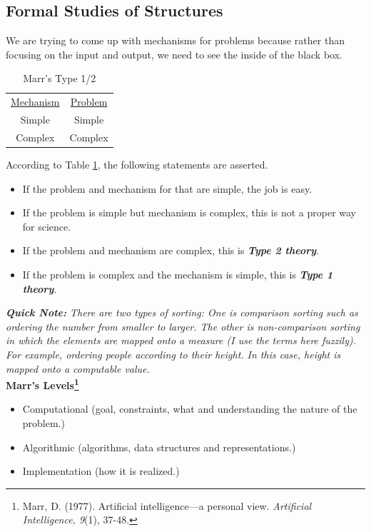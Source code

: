 \documentclass[12pt,a4paper]{article}
\begin{document}
\subsection{Formal Studies of Structures}
We are trying to come up with mechanisms for problems because rather than focusing on the input and output, we need to see the inside of the black box.\\
\begin{table}[H]
\centering
\begin{tabular}{c c}

\hline 
\underline{Mechanism} & \underline{Problem} \\ 
 
Simple & Simple \\ 

Complex & Complex \\ 
\hline
\end{tabular}
\caption{Marr's Type 1/2}
\label{tab:mech}
\end{table}

According to Table \ref{tab:mech}, the following statements are asserted. 
\begin{itemize}
\item If the problem and mechanism for that are simple, the job is easy.
\item If the problem is simple but mechanism is complex, this is not a proper way for science.
\item If the problem and mechanism are complex, this is \textbf{\emph{Type 2 theory}}.
\item If the problem is complex and the mechanism is simple, this is \emph{\textbf{Type 1 theory}}.
\end{itemize}

\indent \textit{\textbf{Quick Note:} There are two types of sorting: One is comparison sorting such as ordering the number from smaller to larger. The other is non-comparison sorting in which the elements are mapped onto a measure (I use the terms here fuzzily). For example, ordering people according to their height. In this case, height is mapped onto a computable value.}\\

\textbf{Marr's Levels\footnote{Marr, D. (1977). Artificial intelligence—a personal view. \textit{Artificial Intelligence, 9}(1), 37-48.}}
\begin{itemize}
\item Computational (goal, constraints, what and understanding the nature of the problem.)
\item Algorithmic (algorithms, data structures and representations.)
\item Implementation (how it is realized.)
\end{itemize}
\end{document}
